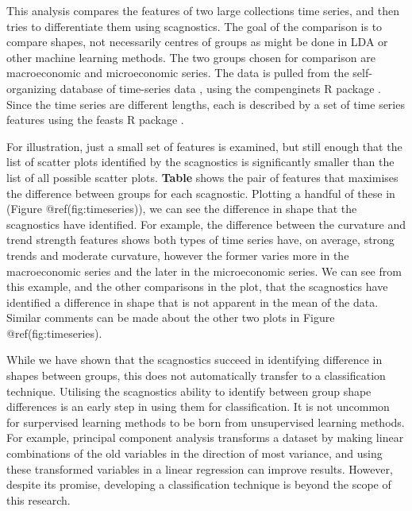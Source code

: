 This analysis compares the features of two large collections time
series, and then tries to differentiate them using scagnostics. The goal
of the comparison is to compare shapes, not necessarily centres of
groups as might be done in LDA or other machine learning methods. The
two groups chosen for comparison are macroeconomic and microeconomic
series. The data is pulled from the self-organizing database of
time-series data \citep{sots}, using the compenginets R package
\citep{compenginets}. Since the time series are different lengths, each
is described by a set of time series features \citep[chapter 4
of][]{fpp} using the feasts R package \citep{feasts}.

For illustration, just a small set of features is examined, but still
enough that the list of scatter plots identified by the scagnostics is
significantly smaller than the list of all possible scatter plots.
\textbf{Table} shows the pair of features that maximises the difference
between groups for each scagnostic. Plotting a handful of these in
(Figure @ref(fig:timeseries)), we can see the difference in shape that
the scagnostics have identified. For example, the difference between the
curvature and trend strength features shows both types of time series
have, on average, strong trends and moderate curvature, however the
former varies more in the macroeconomic series and the later in the
microeconomic series. We can see from this example, and the other
comparisons in the plot, that the scagnostics have identified a
difference in shape that is not apparent in the mean of the data.
Similar comments can be made about the other two plots in Figure
@ref(fig:timeseries).

While we have shown that the scagnostics succeed in identifying
difference in shapes between groups, this does not automatically
transfer to a classification technique. Utilising the scagnostics
ability to identify between group shape differences is an early step in
using them for classification. It is not uncommon for surpervised
learning methods to be born from unsupervised learning methods. For
example, principal component analysis transforms a dataset by making
linear combinations of the old variables in the direction of most
variance, and using these transformed variables in a linear regression
can improve results. However, despite its promise, developing a
classification technique is beyond the scope of this research.

